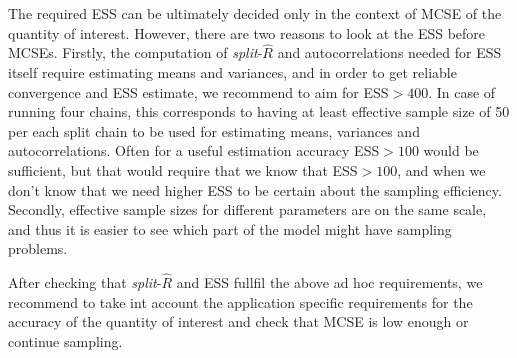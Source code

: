 \documentclass[american,]{article}
\providecommand{\tightlist}{%
  \setlength{\itemsep}{0pt}\setlength{\parskip}{0pt}}
\begin{document}
The required ESS can be ultimately decided only in the context of MCSE
of the quantity of interest. However, there are two reasons to look at
the ESS before MCSEs. Firstly, the computation of
\emph{split}-\(\widehat{R}\) and autocorrelations needed for ESS
itself require estimating means and variances, and in order to get
reliable convergence and ESS estimate, we recommend to aim for
ESS$>400$. In case of running four chains, this corresponds to having
at least effective sample size of 50 per each split chain to be used
for estimating means, variances and autocorrelations. Often for a
useful estimation accuracy ESS$>100$ would be sufficient, but that
would require that we know that ESS$>100$, and when we don't know that
we need higher ESS to be certain about the sampling efficiency.
Secondly, effective sample sizes for different parameters are on the
same scale, and thus it is easier to see which part of the model might
have sampling problems.

After checking that \emph{split}-\(\widehat{R}\) and ESS fullfil the
above ad hoc requirements, we recommend to take int account the
application specific requirements for the accuracy of the quantity of
interest and check that MCSE is low enough or continue sampling.




\end{document}
